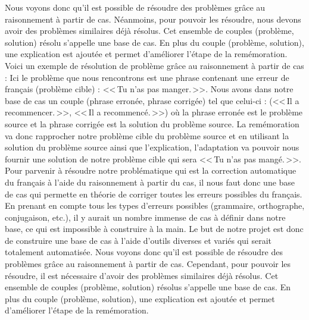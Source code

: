 \documentclass[11pt]{article}
\begin{document}
Nous voyons donc qu'il est possible de r\'{e}soudre des probl\`{e}mes gr\^ace au raisonnement \`{a} partir de cas. N\'{e}anmoins, pour pouvoir les r\'{e}soudre, nous devons avoir des probl\`{e}mes similaires d\'{e}j\`{a} r\'{e}solus. Cet ensemble de couples (probl\`{e}me, solution) r\'{e}solu s'appelle une base de cas. En plus du couple (probl\`{e}me, solution), une explication est ajout\'{e}e et permet d'am\'{e}liorer l'\'{e}tape de la rem\'{e}moration.
\newline
\newline
Voici un exemple de r\'{e}solution de probl\`{e}me gr\^ace au raisonnement \`{a} partir de cas : 
Ici le probl\`{e}me que nous rencontrons est une phrase contenant une erreur de fran\c{c}ais (probl\`{e}me cible) : <<\,Tu n'as pas manger.\,>>.
Nous avons dans notre base de cas un couple (phrase erron\'{e}e, phrase corrig\'{e}e) tel que celui-ci : (<<\,Il a recommencer.\,>>, <<\,Il a recommenc\'{e}.\,>>) o\`{u} la phrase erron\'{e}e est le probl\`{e}me source et la phrase corrig\'{e}e est la solution du probl\`{e}me source.
La rem\'{e}moration va donc rapprocher notre probl\`{e}me cible du probl\`{e}me source et en utilisant la solution du probl\`{e}me source ainsi que l'explication, l'adaptation va pouvoir nous fournir une solution de notre probl\`{e}me cible qui sera <<\,Tu n'as pas mang\'{e}.\,>>.
\newline
\newline
Pour parvenir \`{a} r\'{e}soudre notre probl\'{e}matique qui est la correction automatique du fran\c{c}ais \`{a} l'aide du raisonnement \`{a} partir du cas, il nous faut donc une base de cas qui permette en th\'{e}orie de corriger toutes les erreurs possibles du fran\c{c}ais. En prenant en compte tous les types d'erreurs possibles (grammaire, orthographe, conjugaison, etc.), il y aurait un nombre immense de cas \`{a} d\'{e}finir dans notre base, ce qui est impossible \`{a} construire \`{a} la main. Le but de notre projet est donc de construire une base de cas \`{a} l'aide d'outils diverses et vari\'{e}s qui serait totalement automatis\'{e}e.
\newline
\newline
Nous voyons donc qu'il est possible de r\'{e}soudre des probl\`{e}mes gr\^{a}ce au raisonnement \`{a} partir de cas. Cependant, pour pouvoir les r\'{e}soudre, il est n\'{e}cessaire d'avoir des probl\`{e}mes similaires d\'{e}j\`{a} r\'{e}solus. Cet ensemble de couples (probl\`{e}me, solution) r\'{e}solus s'appelle une base de cas. En plus du couple (probl\`{e}me, solution), une explication est ajout\'{e}e et permet d'am\'{e}liorer l'\'{e}tape de la rem\'{e}moration.
\newline
\newline
\end{document}
